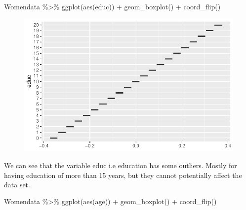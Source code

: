 \documentclass[
  letterpaper,
  DIV=11,
  numbers=noendperiod]{scrartcl}
\newenvironment{Shaded}{\begin{snugshade}}{\end{snugshade}}
\newcommand{\FunctionTok}[1]{\textcolor[rgb]{0.28,0.35,0.67}{#1}}
\newcommand{\NormalTok}[1]{\textcolor[rgb]{0.00,0.23,0.31}{#1}}
\newcommand{\SpecialCharTok}[1]{\textcolor[rgb]{0.37,0.37,0.37}{#1}}
\begin{document}
\begin{Shaded}
\begin{Highlighting}[]
\NormalTok{Womendata }\SpecialCharTok{\%\textgreater{}\%}
  \FunctionTok{ggplot}\NormalTok{(}\FunctionTok{aes}\NormalTok{(educ)) }\SpecialCharTok{+}
  \FunctionTok{geom\_boxplot}\NormalTok{() }\SpecialCharTok{+}
  \FunctionTok{coord\_flip}\NormalTok{()}
\end{Highlighting}
\end{Shaded}

\begin{figure}[H]

{\centering \includegraphics{Fertility_Rates_Education_Impact_Botswana_files/figure-pdf/unnamed-chunk-13-1.pdf}

}

\end{figure}

We can see that the variable educ i.e education has some outliers.
Mostly for having education of more than 15 years, but they cannot
potentially affect the data set.

\begin{Shaded}
\begin{Highlighting}[]
\NormalTok{Womendata }\SpecialCharTok{\%\textgreater{}\%}
  \FunctionTok{ggplot}\NormalTok{(}\FunctionTok{aes}\NormalTok{(age)) }\SpecialCharTok{+}
  \FunctionTok{geom\_boxplot}\NormalTok{() }\SpecialCharTok{+}
  \FunctionTok{coord\_flip}\NormalTok{()}
\end{Highlighting}
\end{Shaded}
\end{document}
